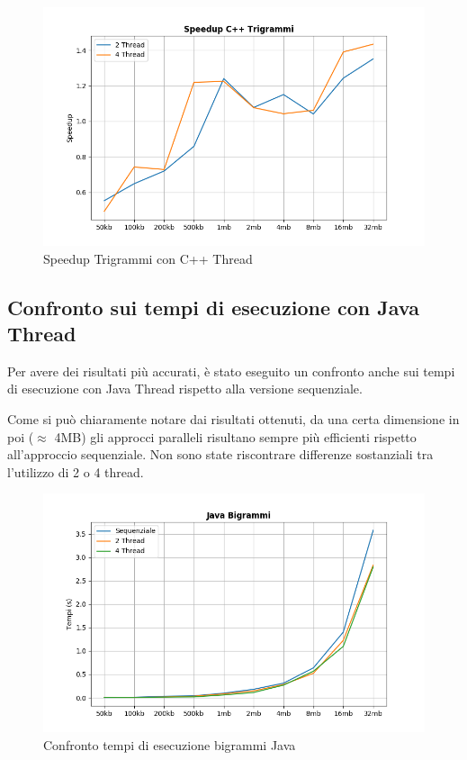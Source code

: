 \documentclass[10pt,twocolumn,letterpaper]{article}
\begin{document}
\begin{figure}[h]
\includegraphics[width=\linewidth]{Plots/speedup_cpp_trigrammi.png}
\caption{Speedup Trigrammi con C++ Thread}
\end{figure}
\newpage

\newpage
\subsection{Confronto sui tempi di esecuzione con Java Thread}
Per avere dei risultati più accurati, è stato eseguito un confronto anche sui tempi di esecuzione con Java Thread rispetto alla versione sequenziale.

Come si può chiaramente notare dai risultati ottenuti, da una certa dimensione in poi ($\approx$ 4MB) gli approcci paralleli risultano sempre più efficienti rispetto all'approccio sequenziale. Non sono state riscontrare differenze sostanziali tra l'utilizzo di 2 o 4 thread.
\begin{figure}[h]
\includegraphics[width=\linewidth]{Plots/tempi_java_bigrammi.png}
\caption{Confronto tempi di esecuzione bigrammi Java}
\end{figure}
\end{document}
